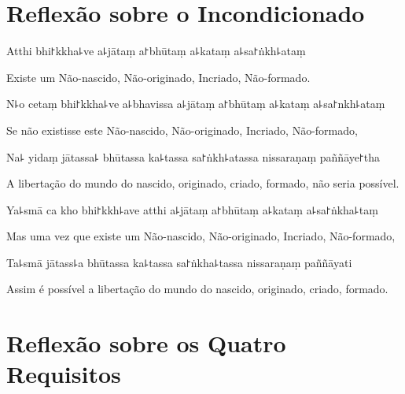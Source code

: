 \chapter[Incondicionado]{Reflexão sobre o Incondicionado}


\begin{leader}
\end{leader}

Atthi bhi꜓kkha꜕ve a꜕jātaṃ a꜓bhūtaṃ a꜕kataṃ a꜕sa꜓ṅkh꜕ataṃ

\begin{english}
  Existe um Não-nascido, Não-originado, Incriado, Não-formado.
\end{english}

N꜕o cetaṃ bhi꜓kkha꜕ve a꜕bhavissa a꜕jātaṃ a꜓bhūtaṃ a꜕kataṃ a꜕sa꜓nkh꜕ataṃ

\begin{english}
 Se não existisse este Não-nascido, Não-originado, Incriado, Não-formado,
\end{english}

Na꜕ yidaṃ jātassa꜕ bhūtassa ka꜕tassa sa꜓ṅkh꜕atassa nissaraṇaṃ paññāye꜓tha

\begin{english}
  A libertação do mundo do nascido, originado, criado, formado, não seria possível.
\end{english}

Ya꜕smā ca kho bhi꜓kkh꜕ave atthi a꜕jātaṃ a꜓bhūtaṃ a꜕kataṃ a꜕sa꜓ṅkha꜕taṃ

\begin{english}
  Mas uma vez que existe um Não-nascido, Não-originado, Incriado, Não-formado,
\end{english}

Ta꜕smā jātass꜕a bhūtassa ka꜕tassa sa꜓ṅkha꜕tassa nissaraṇaṃ paññāyati

\begin{english}
  Assim é possível a libertação do mundo do nascido, originado, criado, formado.
\end{english}

\chapter[Quatro Requisitos]{Reflexão sobre os Quatro Requisitos}


\begin{leader}
\end{leader}

